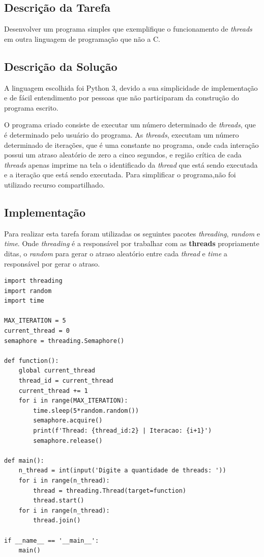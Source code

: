 \documentclass[a4paper, 11pt]{article}
\begin{document}
\subsection{Descrição da Tarefa}
Desenvolver um programa simples que exemplifique o funcionamento de \textit{threads} em outra linguagem de programação que não a C.

\subsection{Descrição da Solução}
A linguagem escolhida foi Python 3, devido a sua simplicidade de implementação e de fácil entendimento por pessoas que não participaram da construção do programa escrito.

O programa criado consiste de executar um número determinado de \textit{threads}, que é determinado pelo usuário do programa. As \textit{threads}, executam um número determinado de iterações, que é uma constante no programa, onde cada interação possui um atraso aleatório de zero a cinco segundos, e região crítica de cada \textit{threads} apenas imprime na tela o identificado da \textit{thread} que está sendo executada e a iteração que está sendo executada. Para simplificar o programa,não foi utilizado recurso compartilhado.

\subsection{Implementação}
Para realizar esta tarefa foram utilizadas os seguintes pacotes \textit{threading}, \textit{random} e \textit{time}. Onde \textit{threading} é a responsável por trabalhar com as \textbf{threads} propriamente ditas, o \textit{random} para gerar o atraso aleatório entre cada \textit{thread} e \textit{time} a responsável por gerar o atraso.

\lstset{language=Python}
\begin{lstlisting}
import threading
import random
import time

MAX_ITERATION = 5
current_thread = 0
semaphore = threading.Semaphore()

def function():
    global current_thread
    thread_id = current_thread
    current_thread += 1
    for i in range(MAX_ITERATION):
        time.sleep(5*random.random())
        semaphore.acquire()
        print(f'Thread: {thread_id:2} | Iteracao: {i+1}')
        semaphore.release()

def main():
    n_thread = int(input('Digite a quantidade de threads: '))
    for i in range(n_thread):
        thread = threading.Thread(target=function)
        thread.start()
    for i in range(n_thread):
        thread.join()

if __name__ == '__main__':
	main()
\end{lstlisting}

\nocite{*}


\end{document}
